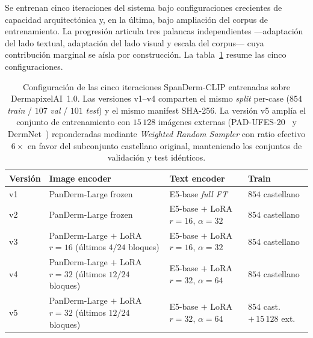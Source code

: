 Se entrenan cinco iteraciones del sistema bajo configuraciones
crecientes de capacidad arquitectónica y, en la última, bajo
ampliación del corpus de entrenamiento. La progresión articula tres
palancas independientes ---adaptación del lado textual, adaptación
del lado visual y escala del corpus--- cuya contribución marginal
se aísla por construcción. La
tabla~\ref{tab:spanderm-config} resume las cinco configuraciones.

\begin{table}[H]
\centering
\footnotesize
\setlength{\tabcolsep}{4pt}
\renewcommand{\arraystretch}{0.95}
\caption{Configuración de las cinco iteraciones SpanDerm-CLIP
entrenadas sobre DermapixelAI~1.0. Las versiones v1--v4 comparten
el mismo \emph{split} per-case ($854$ \emph{train} / $107$ \emph{val} /
$101$ \emph{test}) y el mismo manifest SHA-256. La versión v5
amplía el conjunto de entrenamiento con $15\,128$ imágenes externas
(PAD-UFES-20~\cite{padufes} y DermNet~\cite{dermnet}) reponderadas
mediante \emph{Weighted Random Sampler} con ratio efectivo $6\times$
en favor del subconjunto castellano original, manteniendo los
conjuntos de validación y test idénticos.}
\label{tab:spanderm-config}
\begin{tabular}{llll}
\hline
Versión & Image encoder                                                  & Text encoder              & Train \\
\hline
v1      & PanDerm-Large frozen                                            & E5-base \emph{full FT}    & $854$ castellano \\
v2      & PanDerm-Large frozen                                            & E5-base $+$ LoRA $r=16$, $\alpha=32$ & $854$ castellano \\
v3      & PanDerm-Large $+$ LoRA $r=16$ (últimos $4/24$ bloques)           & E5-base $+$ LoRA $r=16$, $\alpha=32$ & $854$ castellano \\
v4      & PanDerm-Large $+$ LoRA $r=32$ (últimos $12/24$ bloques)          & E5-base $+$ LoRA $r=32$, $\alpha=64$ & $854$ castellano \\
v5      & PanDerm-Large $+$ LoRA $r=32$ (últimos $12/24$ bloques)          & E5-base $+$ LoRA $r=32$, $\alpha=64$ & $854$ cast. $+\,15\,128$ ext. \\
\hline
\end{tabular}
\end{table}

